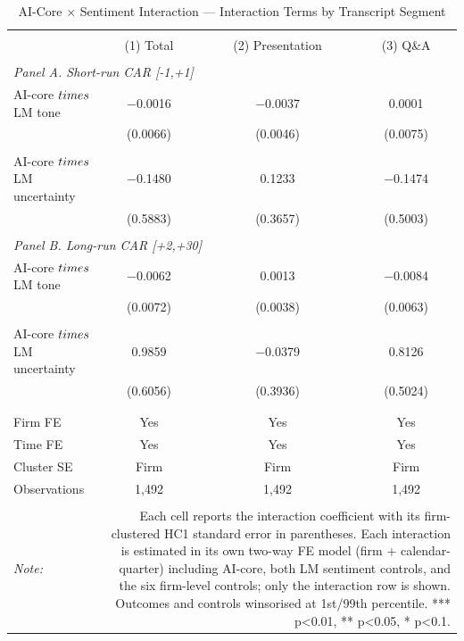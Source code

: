 \begin{table}[!htbp] \centering
  \caption{AI-Core $\times$ Sentiment Interaction --- Interaction Terms by Transcript Segment}
  \label{tab:int_summary}
\begin{tabular}{@{\extracolsep{5pt}}lccc}
\\[-1.8ex]\hline
\hline \\[-1.8ex]
 & (1) Total & (2) Presentation & (3) Q\&A \\
\hline \\[-1.8ex]
 \multicolumn{4}{l}{\textit{Panel A. Short-run CAR [-1,+1]}} \\[2pt]
 AI-core $\\times$ LM tone & $-$0.0016 & $-$0.0037 & 0.0001 \\
  & (0.0066) & (0.0046) & (0.0075) \\
  & & & \\
 AI-core $\\times$ LM uncertainty & $-$0.1480 & 0.1233 & $-$0.1474 \\
  & (0.5883) & (0.3657) & (0.5003) \\
  & & & \\
 \multicolumn{4}{l}{\textit{Panel B. Long-run CAR [+2,+30]}} \\[2pt]
 AI-core $\\times$ LM tone & $-$0.0062 & 0.0013 & $-$0.0084 \\
  & (0.0072) & (0.0038) & (0.0063) \\
  & & & \\
 AI-core $\\times$ LM uncertainty & 0.9859 & $-$0.0379 & 0.8126 \\
  & (0.6056) & (0.3936) & (0.5024) \\
  & & & \\
\hline \\[-1.8ex]
 Firm FE & Yes & Yes & Yes \\
 Time FE & Yes & Yes & Yes \\
 Cluster SE & Firm & Firm & Firm \\
 Observations & 1,492 & 1,492 & 1,492 \\
\hline
\hline \\[-1.8ex]
\textit{Note:}  & \multicolumn{3}{r}{Each cell reports the interaction coefficient with its firm-clustered HC1 standard error in parentheses. Each interaction is estimated in its own two-way FE model (firm + calendar-quarter) including AI-core, both LM sentiment controls, and the six firm-level controls; only the interaction row is shown. Outcomes and controls winsorised at 1st/99th percentile. *** p<0.01, ** p<0.05, * p<0.1.} \\
\end{tabular}
\end{table}
